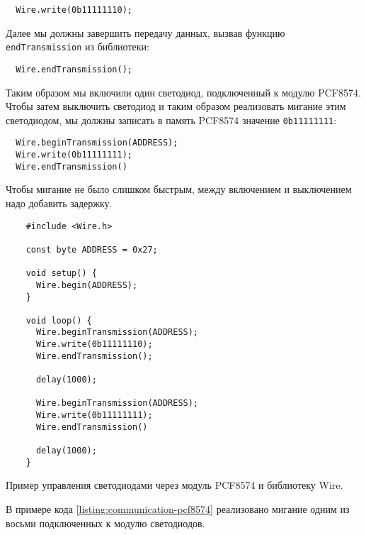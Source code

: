 \documentclass[../sparc.tex]{subfiles}
\begin{document}
\begin{verbatim}
  Wire.write(0b11111110);
\end{verbatim}

Далее мы должны завершить передачу данных, вызвав функцию
\texttt{endTransmission} из библиотеки:

\begin{verbatim}
  Wire.endTransmission();
\end{verbatim}

Таким образом мы включили один светодиод, подключенный к модулю PCF8574.  Чтобы
затем выключить светодиод и таким образом реализовать мигание этим светодиодом,
мы должны записать в память PCF8574 значение \texttt{0b11111111}:

\begin{verbatim}
  Wire.beginTransmission(ADDRESS);
  Wire.write(0b11111111);
  Wire.endTransmission()
\end{verbatim}

Чтобы мигание не было слишком быстрым, между включением и выключением надо
добавить задержку.

\begin{listing}[H]
  \begin{verbatim}
    #include <Wire.h>

    const byte ADDRESS = 0x27;

    void setup() {
      Wire.begin(ADDRESS);
    }

    void loop() {
      Wire.beginTransmission(ADDRESS);
      Wire.write(0b11111110);
      Wire.endTransmission();

      delay(1000);

      Wire.beginTransmission(ADDRESS);
      Wire.write(0b11111111);
      Wire.endTransmission()

      delay(1000);
    }
  \end{verbatim}
  \label{listing:communication-pcf8574}
  \caption{Пример управления светодиодами через модуль PCF8574 и библиотеку
    Wire.}
\end{listing}

В примере кода \ref{listing:communication-pcf8574} реализовано мигание одним из
восьми подключенных к модулю светодиодов.
\end{document}
